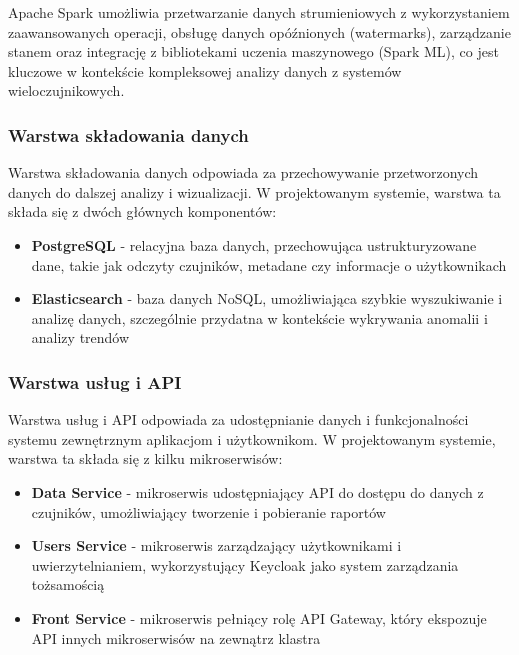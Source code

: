 Apache Spark umożliwia przetwarzanie danych strumieniowych z wykorzystaniem zaawansowanych operacji, obsługę danych opóźnionych (watermarks), zarządzanie stanem oraz integrację z bibliotekami uczenia maszynowego (Spark ML), co jest kluczowe w kontekście kompleksowej analizy danych z systemów wieloczujnikowych.

\subsubsection{Warstwa składowania danych}
\label{subsubsec:warstwa_skladowania}

Warstwa składowania danych odpowiada za przechowywanie przetworzonych danych do dalszej analizy i wizualizacji. W projektowanym systemie, warstwa ta składa się z dwóch głównych komponentów:

\begin{itemize}
    \item \textbf{PostgreSQL} - relacyjna baza danych, przechowująca ustrukturyzowane dane, takie jak odczyty czujników, metadane czy informacje o użytkownikach
    \item \textbf{Elasticsearch} - baza danych NoSQL, umożliwiająca szybkie wyszukiwanie i analizę danych, szczególnie przydatna w kontekście wykrywania anomalii i analizy trendów
\end{itemize}

\subsubsection{Warstwa usług i API}
\label{subsubsec:warstwa_uslug}

Warstwa usług i API odpowiada za udostępnianie danych i funkcjonalności systemu zewnętrznym aplikacjom i użytkownikom. W projektowanym systemie,
warstwa ta składa się z kilku mikroserwisów:

\begin{itemize}
    \item \textbf{Data Service} - mikroserwis udostępniający API do dostępu do danych z czujników, umożliwiający tworzenie i pobieranie raportów
    \item \textbf{Users Service} - mikroserwis zarządzający użytkownikami i uwierzytelnianiem, wykorzystujący Keycloak jako system zarządzania tożsamością
    \item \textbf{Front Service} - mikroserwis pełniący rolę API Gateway, który ekspozuje API innych mikroserwisów na zewnątrz klastra
\end{itemize}

